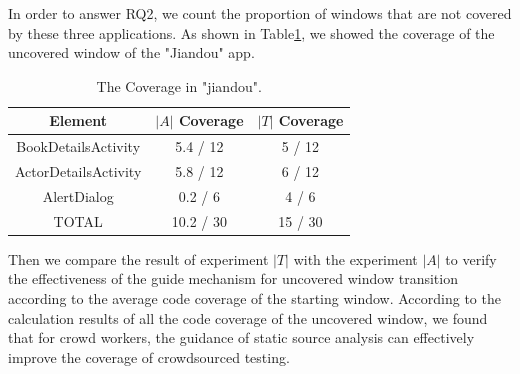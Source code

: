 In order to answer RQ2, we count the proportion of windows that are not covered by these three applications. As shown in Table\ref{fig:xixi}, we showed the coverage of the uncovered window of the "Jiandou" app.
\begin{table}[tb]
\caption{The Coverage in "jiandou".}
\begin{center}
\begin{tabular}{|c|c|c|} %
\hline 
Element&$\left|A\right|$ Coverage&$\left|T\right|$ Coverage\\
\hline  
BookDetailsActivity&5.4 / 12&5 / 12\\
\hline 
ActorDetailsActivity&5.8 / 12&6 / 12\\
\hline 
AlertDialog&0.2 / 6&4 / 6\\
\hline 
TOTAL&10.2 / 30&15 / 30\\
\hline 
\end{tabular}
\label{fig:xixi}
\end{center}
\end{table}

Then we compare the result of experiment $\left|T\right|$ with the experiment $\left|A\right|$ to verify the effectiveness of the guide mechanism for uncovered window transition according to the average code coverage of the starting window.
According to the calculation results of all the code coverage of the uncovered window, we found that for crowd workers, the guidance of static source analysis can effectively improve the coverage of crowdsourced testing.